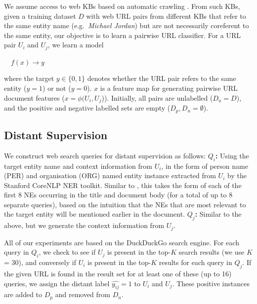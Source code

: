 \documentclass[letterpaper]{sig-alternate-2013}
\newcommand{\ex}[1]{\textit{#1}\xspace}
\begin{document}
We assume access to web KBs based on automatic crawling \cite{chisholm2016akbc}. 
From such KBs, given a training dataset $D$ with web URL pairs from different KBs that refer to the same entity name
 (e.g.\ \ex{Michael Jordan}) but are not necessarily coreferent to the same entity, our objective is to learn a pairwise URL classifier. For a URL pair $U_{i}$ and $U_{j}$, we learn a model \begin{small} $\quad f(x) \to y$ \end{small} where the target $y \in \{0,1\}$ denotes whether the URL pair refers to the same entity ($y=1$) or not ($y=0$).  $x$ is a feature map for generating pairwise URL document features ($x=\phi(U_{i}, U_{j}$)). Initially, all pairs are unlabelled ($D_{u}=D$), and the positive and negative labelled sets are empty ($D_{p}, D_{n} = \emptyset$).

\subsection{Distant Supervision} 
\label{sec:querying}

We construct web search queries for distant supervision as follows:
\textbf{$Q_i$:} Using the target entity name and context information from $U_{i}$, in the form of person name (PER) and organisation (ORG) named entity instance extracted from $U_i$ by the Stanford CoreNLP NER toolkit.  Similar to \cite{nuray2009exploiting}, this takes the form of each of the first 8 NEs occurring in the title and document body (for a total of up to 8 separate queries), based on the intuition that the NEs that are most relevant to the target entity will be mentioned earlier in the document.
\textbf{$Q_j$:} Similar to the above, but we generate the context information from  $U_{j}$.

All of our experiments are based on the DuckDuckGo search engine. For each query in $Q_i$, we check to see if $U_{j}$ is present in the top-$K$ search results (we use $K$ = 30), and conversely if $U_i$ is present in the top-$K$ results for each query in $Q_j$. If the given URL is found in the result set for at least one of these (up to 16) queries, we assign the distant label $\hat{y_{ij}}=1$ to $U_{i}$ and $U_{j}$. These positive instances are added to $D_{p}$ and removed from $D_{u}$.
\end{document}
